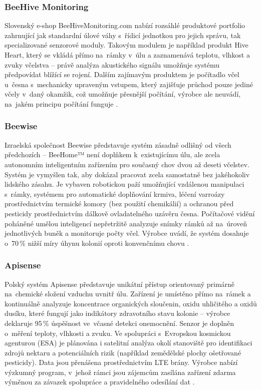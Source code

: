 \subsubsection*{BeeHive Monitoring}
Slovenský e-shop BeeHiveMonitoring.com nabízí rozsáhlé produktové portfolio zahrnující jak standardní úlové váhy s~řídicí jednotkou pro jejich správu, tak specializované senzorové moduly. Takovým modulem je například produkt Hive Heart, který se vkládá přímo na~rámky v~úlu a zaznamenává teplotu, vlhkost a zvuky včelstva -- právě analýza akustického signálu umožňuje systému předpovídat blížící se rojení. Dalším zajímavým produktem je počítadlo včel u~česna s~mechanicky upraveným vstupem, který zajišťuje průchod pouze jediné včely v~daný okamžik, což umožňuje přesnější počítání, výrobce ale neuvádí, na~jakém principu počítání funguje \cite{beehivemonitoring}.

\subsubsection*{Beewise}
Izraelská společnost Beewise představuje systém zásadně odlišný od všech předchozích -- BeeHome™ není doplňkem k~existujícímu úlu, ale zcela autonomním inteligentním zařízením pro současný chov dvou až deseti včelstev. Systém je vymyšlen tak, aby dokázal pracovat zcela samostatně bez jakéhokoliv lidského zásahu. Je vybaven robotickou paží umožňující vzdálenou manipulaci s~rámky, systémem pro automatické doplňování krmiva, léčení varroázy prostřednictvím termické komory (bez použití chemikálií) a ochranou před pesticidy prostřednictvím dálkově ovladatelného uzávěru česna. Počítačové vidění poháněné umělou inteligencí nepřetržitě analyzuje snímky rámků až na~úroveň jednotlivých buněk a monitoruje počty včel. Výrobce uvádí, že systém dosahuje o~70\,\% nižší míry úhynu kolonií oproti konvenčnímu chovu \cite{beewise}.

\subsubsection*{Apisense}
Polský systém Apisense představuje unikátní přístup orientovaný primárně na~chemické složení vzduchu uvnitř úlu. Zařízení je umístěno přímo na~rámek a kontinuálně analyzuje koncentrace organických sloučenin, oxidu uhličitého a oxidů dusíku, které fungují jako indikátory zdravotního stavu kolonie -- výrobce deklaruje 95\,\% úspěšnost ve~včasné detekci onemocnění. Senzor je doplněn o~měření teploty, vlhkosti a zvuku. Ve spolupráci s~Evropskou kosmickou agenturou (ESA) je plánována i satelitní analýza okolí stanoviště pro identifikaci zdrojů nektaru a potenciálních rizik (například zemědělské plochy ošetřované pesticidy). Data jsou přenášena prostřednictvím LTE brány. Výrobce nabízí výzkumný program, v~jehož rámci jsou zájemcům zasílána zařízení zdarma výměnou za závazek spolupráce a pravidelného odesílání dat \cite{apisense}.


